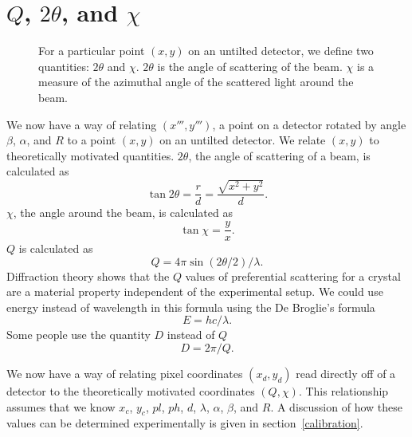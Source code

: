 \section{\texorpdfstring{$Q$, $2\theta$, and $\chi$}{Q, 2theta, and chi}}

\begin{SCfigure}[1][htbp]
    \centering
    
    \caption{For a particular point $(x,y)$ on an 
    untilted detector, we define two quantities:
    $2\theta$ and $\chi$. $2\theta$ is the angle of 
    scattering of the beam. $\chi$ is a measure of the 
    azimuthal angle of the scattered light around 
    the beam.}
    \label{TwoTheta}
\end{SCfigure}

We now have a way of relating $(x''',y''')$, 
a point on a detector rotated by angle $\beta$, 
$\alpha$, and $R$ to a point $(x,y)$
on an untilted detector.
We relate $(x,y)$ to theoretically motivated 
quantities. $2\theta$, the angle of scattering 
of a beam, is calculated as
\begin{equation}\label{2thetatermsr}
    \tan2\theta = \frac{r}{d} = \frac{\sqrt{x^2+y^2}}{d}.
\end{equation}
$\chi$, the angle around the beam, is calculated as
\begin{equation}\label{chitermsyx}
    \tan\chi = \frac{y}{x}.
\end{equation}
$Q$ is calculated as
\begin{equation}\label{qterms2theta}
    Q = 4\pi \sin(2\theta/2)/\lambda.
\end{equation}
Diffraction theory shows that the $Q$ values of preferential 
scattering for a crystal are a material property independent 
of the experimental setup. 
We could use energy instead of wavelength in this formula 
using the De Broglie's formula
\begin{equation}
    E = hc/\lambda.
\end{equation}
Some people use the quantity $D$ instead of $Q$
\begin{equation}\label{DtermsQ}
    D = 2\pi/Q.
\end{equation}

We now have a way of relating pixel
coordinates $(x_d,y_d)$ read directly off
of a detector to the
theoretically motivated coordinates $(Q,\chi)$.
This relationship assumes that we know
$x_c$, $y_c$, $pl$, $ph$, $d$, $\lambda$,
$\alpha$, $\beta$, and $R$. A discussion of
how these values can be determined experimentally
is given in section~\ref{calibration}.


